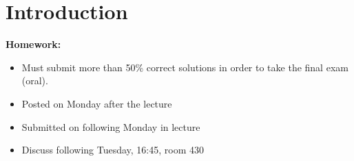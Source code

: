 \documentclass[main.tex]{subfiles}
\begin{document}
\chapter{Introduction}
\label{ch:introduction}

\textbf{Homework:}
\begin{itemize}
  \item Must submit more than 50\% correct solutions in order to take the final exam (oral).

  \item Posted on Monday after the lecture

  \item Submitted on following Monday in lecture

  \item Discuss following Tuesday, 16:45, room 430
\end{itemize}
\end{document}
